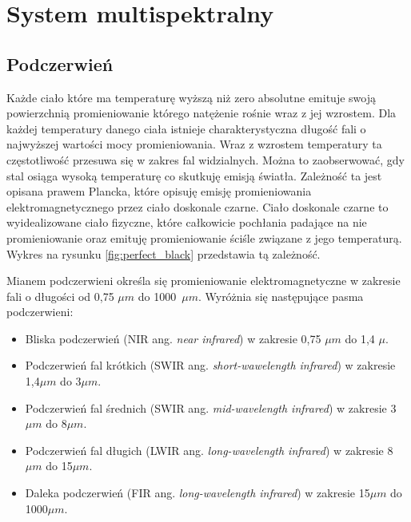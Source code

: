 \chapter{System multispektralny}
\label{cha:multispectral}


 
\section{Podczerwień}

Każde ciało które ma temperaturę wyższą niż zero absolutne emituje swoją powierzchnią promieniowanie którego natężenie rośnie wraz z jej wzrostem.
Dla każdej temperatury danego ciała istnieje charakterystyczna długość fali o najwyższej wartości mocy promieniowania. Wraz z wzrostem temperatury ta częstotliwość przesuwa się w zakres fal widzialnych. 
Można to zaobserwować, gdy stal osiąga wysoką temperaturę co skutkuję emisją światła. 
Zależność ta jest opisana prawem Plancka, które opisuję emisję promieniowania elektromagnetycznego przez ciało doskonale czarne. 
Ciało doskonale czarne to wyidealizowane ciało fizyczne, które całkowicie pochłania padające na nie promieniowanie oraz emituję promieniowanie ściśle związane z jego temperaturą.
Wykres na rysunku \ref{fig:perfect_black} przedstawia tą zależność. 

Mianem podczerwieni określa się promieniowanie elektromagnetyczne w zakresie fali o długości od 0,75 $\mu m$ do 1000~$\mu m$. Wyróżnia się następujące pasma podczerwieni:
\begin{itemize}
\item Bliska podczerwień (NIR ang. \textit{near infrared}) w zakresie 0,75 $\mu m$ do 1,4 $\mu$.
\item Podczerwień fal krótkich (SWIR ang. \textit{short-wawelength infrared}) w zakresie 1,4$\mu m$ do 3$\mu m$.
\item Podczerwień fal średnich (SWIR ang. \textit{mid-wavelength infrared}) w zakresie 3$\mu m$ do 8$\mu m$.
\item Podczerwień fal długich (LWIR ang. \textit{long-wavelength infrared}) w zakresie 8$\mu m$ do 15$\mu m$.
\item Daleka podczerwień (FIR ang. \textit{long-wavelength infrared}) w zakresie 15$\mu m$ do 1000$\mu m$.
\end{itemize}


